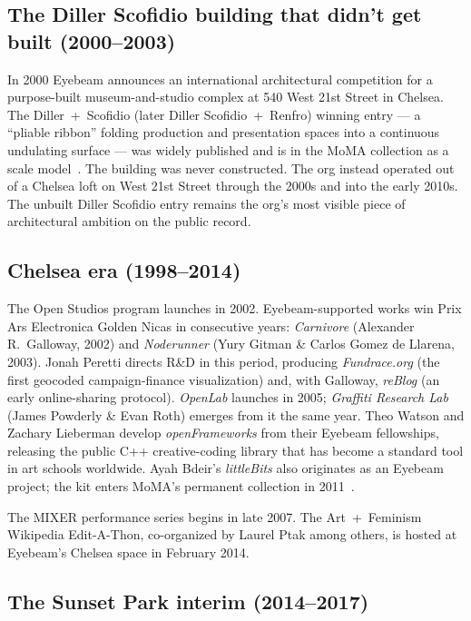 \documentclass[10pt,letterpaper,twocolumn]{article}
\begin{document}
\subsection{The Diller Scofidio building that didn't get built (2000--2003)}

In 2000 Eyebeam announces an international architectural competition for a purpose-built museum-and-studio complex at 540 West 21st Street in Chelsea. The Diller~+~Scofidio (later Diller Scofidio~+~Renfro) winning entry --- a ``pliable ribbon'' folding production and presentation spaces into a continuous undulating surface --- was widely published and is in the MoMA collection as a scale model~\citep{moma2001dsr,domus2002dsr,dsrny2026eyebeam}. The building was never constructed. The org instead operated out of a Chelsea loft on West 21st Street through the 2000s and into the early 2010s. The unbuilt Diller Scofidio entry remains the org's most visible piece of architectural ambition on the public record.

\subsection{Chelsea era (1998--2014)}

The Open Studios program launches in 2002. Eyebeam-supported works win Prix Ars Electronica Golden Nicas in consecutive years: \emph{Carnivore} (Alexander R.~Galloway, 2002) and \emph{Noderunner} (Yury Gitman \& Carlos Gomez de Llarena, 2003). Jonah Peretti directs R\&D in this period, producing \emph{Fundrace.org} (the first geocoded campaign-finance visualization) and, with Galloway, \emph{reBlog} (an early online-sharing protocol). \emph{OpenLab} launches in 2005; \emph{Graffiti Research Lab} (James Powderly \& Evan Roth) emerges from it the same year. Theo Watson and Zachary Lieberman develop \emph{openFrameworks} from their Eyebeam fellowships, releasing the public C++ creative-coding library that has become a standard tool in art schools worldwide. Ayah Bdeir's \emph{littleBits} also originates as an Eyebeam project; the kit enters MoMA's permanent collection in 2011~\citep{wikipedia2026eyebeam}.

The MIXER performance series begins in late 2007. The Art~+~Feminism Wikipedia Edit-A-Thon, co-organized by Laurel Ptak among others, is hosted at Eyebeam's Chelsea space in February 2014.

\subsection{The Sunset Park interim (2014--2017)}
\end{document}
